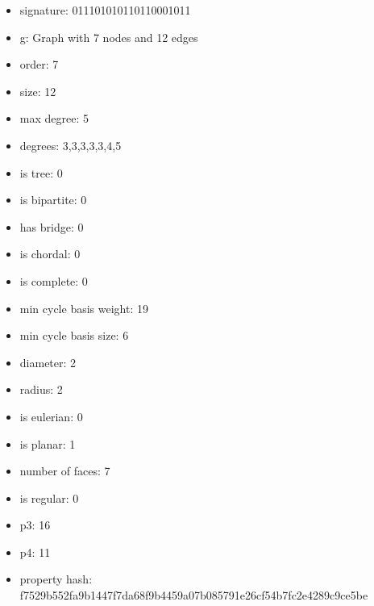 \begin{itemize}
\item signature: 011101010110110001011
\item g: Graph with 7 nodes and 12 edges
\item order: 7
\item size: 12
\item max degree: 5
\item degrees: 3,3,3,3,3,4,5
\item is tree: 0
\item is bipartite: 0
\item has bridge: 0
\item is chordal: 0
\item is complete: 0
\item min cycle basis weight: 19
\item min cycle basis size: 6
\item diameter: 2
\item radius: 2
\item is eulerian: 0
\item is planar: 1
\item number of faces: 7
\item is regular: 0
\item p3: 16
\item p4: 11
\item property hash: f7529b552fa9b1447f7da68f9b4459a07b085791e26cf54b7fc2e4289c9ce5be
\end{itemize}
\newpage
\begin{figure}
\end{figure}
